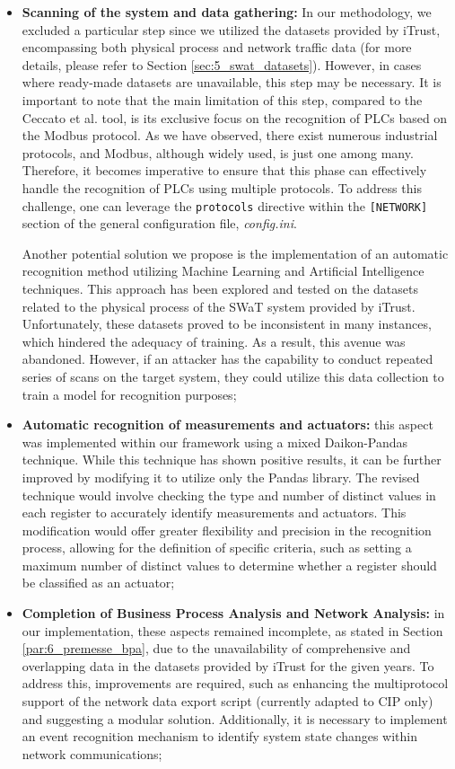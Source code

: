 \begin{itemize}
	\item \textbf{Scanning of the system and data gathering:} In our methodology, we excluded a particular step since we utilized the datasets provided by iTrust, encompassing both physical process and network traffic data (for more details, please refer to Section \ref{sec:5_swat_datasets}). However, in cases where ready-made datasets are unavailable, this step may be necessary. It is important to note that the main limitation of this step, compared to the Ceccato et al. tool, is its exclusive focus on the recognition of PLCs based on the Modbus protocol. As we have observed, there exist numerous industrial protocols, and Modbus, although widely used, is just one among many. Therefore, it becomes imperative to ensure that this phase can effectively handle the recognition of PLCs using multiple protocols. To address this challenge, one can leverage the \texttt{protocols} directive within the \texttt{[NETWORK]} section of the general configuration file, \textit{config.ini}.
	
	\bigskip
	Another potential solution we propose is the implementation of an automatic recognition method utilizing Machine Learning and Artificial Intelligence techniques. This approach has been explored and tested on the datasets related to the physical process of the SWaT system provided by iTrust. Unfortunately, these datasets proved to be inconsistent in many instances, which hindered the adequacy of training. As a result, this avenue was abandoned. However, if an attacker has the capability to conduct repeated series of scans on the target system, they could utilize this data collection to train a model for recognition purposes;
	
	\item \textbf{Automatic recognition of measurements and actuators:} this aspect was implemented within our framework using a mixed Daikon-Pandas technique. While this technique has shown positive results, it can be further improved by modifying it to utilize only the Pandas library. The revised technique would involve checking the type and number of distinct values in each register to accurately identify measurements and actuators. This modification would offer greater flexibility and precision in the recognition process, allowing for the definition of specific criteria, such as setting a maximum number of distinct values to determine whether a register should be classified as an actuator;
	
	\item \textbf{Completion of Business Process Analysis and Network Analysis:} in our implementation, these aspects remained incomplete, as stated in Section \ref{par:6_premesse_bpa}, due to the unavailability of comprehensive and overlapping data in the datasets provided by iTrust for the given years. To address this, improvements are required, such as enhancing the multiprotocol support of the network data export script (currently adapted to CIP only) and suggesting a modular solution. Additionally, it is necessary to implement an event recognition mechanism to identify system state changes within network communications;
	

\end{itemize}
